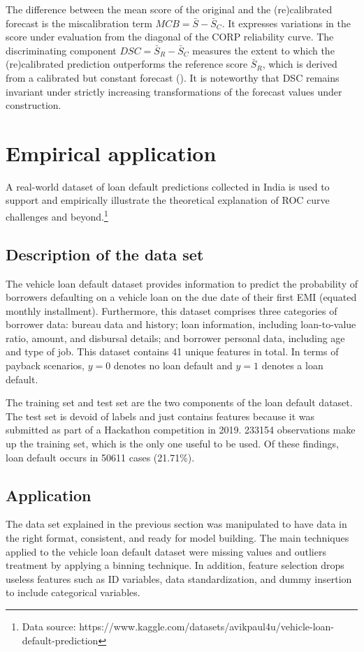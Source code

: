 \documentclass[a4paper,12pt]{article}
\numberwithin{equation}{section}
\begin{document}
   The difference between the mean score of the original and the (re)calibrated forecast is the miscalibration term $MCB = \bar{S} - \bar{S}_{C}$. It expresses variations in the score under evaluation from the diagonal of the CORP reliability curve. The discriminating component $DSC = \bar{S}_{R} - \bar{S}_{C}$ measures the extent to which the (re)calibrated prediction outperforms the reference score $\bar{S}_{R}$, which is derived from a calibrated but constant forecast (\cite{roc1}). It is noteworthy that DSC remains invariant under strictly increasing transformations of the forecast values under construction.
   
\section{Empirical application}
A real-world dataset of loan default predictions collected in India is used to support and empirically illustrate the theoretical explanation of  ROC curve challenges and beyond.\footnote[1]{Data source: https://www.kaggle.com/datasets/avikpaul4u/vehicle-loan-default-prediction}


   \subsection{Description of the data set}
   The vehicle loan default dataset provides information to predict the probability of borrowers defaulting on a vehicle loan on the due date of their first EMI (equated monthly installment). Furthermore, this dataset comprises three categories of borrower data: bureau data and history; loan information, including loan-to-value ratio, amount, and disbursal details; and borrower personal data, including age and type of job. This dataset contains 41 unique features in total. In terms of payback scenarios, $y = 0$ denotes no loan default and $y = 1$ denotes a loan default.\bigskip 

   The training set and test set are the two components of the loan default dataset. The test set is devoid of labels and just contains features because it was submitted as part of a Hackathon competition in 2019. 233154 observations make up the training set, which is the only one useful to be used. Of these findings, loan default occurs in 50611 cases (21.71\%).

   \subsection{Application}
   The data set explained in the previous section was manipulated to have data in the right format, consistent, and ready for model building. The main techniques applied to the vehicle loan default dataset were missing values and outliers treatment by applying a binning technique. In addition, feature selection drops useless features such as ID variables, data standardization, and dummy insertion to include categorical variables.\bigskip 
   
\end{document}
